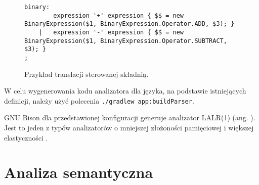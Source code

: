 \begin{figure}
\centering
\begin{lstlisting}
binary:
        expression '+' expression { $$ = new BinaryExpression($1, BinaryExpression.Operator.ADD, $3); }
    |   expression '-' expression { $$ = new BinaryExpression($1, BinaryExpression.Operator.SUBTRACT, $3); }
;
\end{lstlisting}
\caption{Przykład translacji sterowanej składnią.}
\label{fig:lst:tss}
\end{figure}
W celu wygenerowania kodu analizatora dla języka, na podstawie istniejących definicji, należy użyć polecenia \lstinline|./gradlew app:buildParser|.

GNU Bison dla przedstawionej konfiguracji generuje analizator LALR(1) (ang. ). Jest to jeden z typów analizatorów o mniejszej złożoności pamięciowej i większej elastyczności  \cite{baqaiComparisonParsingTechniques}.

\section{Analiza semantyczna}

